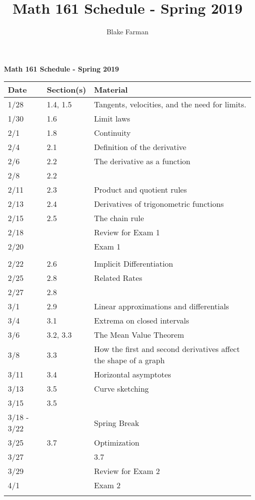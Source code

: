 \documentclass[10pt]{amsart}
\author{Blake Farman}
\title[Schedule]{Math 161 Schedule - Spring 2019}
\begin{document}

\begin{center}
  \textbf{Math 161 Schedule - Spring 2019}
  \begin{tabular}{lll}
  Date & Section(s) & Material\\
  \hline
  1/28 & 1.4, 1.5 & Tangents, velocities, and the need for limits.\\
  1/30 & 1.6 & Limit laws\\
  2/1 & 1.8 & Continuity\\
  2/4 & 2.1 & Definition of the derivative\\
  2/6 & 2.2 & The derivative as a function\\
  2/8 & 2.2 \\
  2/11 & 2.3 & Product and quotient rules\\
  2/13 & 2.4 & Derivatives of trigonometric functions\\
  2/15 & 2.5 & The chain rule\\
  2/18 & & Review for Exam 1\\
  2/20 & & Exam 1\\
  \hline\\
  2/22 & 2.6 & Implicit Differentiation\\
  2/25 & 2.8 & Related Rates\\
  2/27 & 2.8\\
  3/1 & 2.9 & Linear approximations and differentials\\
  3/4 & 3.1 & Extrema on closed intervals\\
  3/6 & 3.2, 3.3 & The Mean Value Theorem\\
  3/8 & 3.3 & How the first and second derivatives affect the shape of a graph\\
  3/11 & 3.4  & Horizontal asymptotes\\
  3/13 & 3.5 & Curve sketching\\
  3/15 & 3.5\\
  3/18 - 3/22 & & Spring Break\\
  3/25 & 3.7 & Optimization\\
  3/27 & & 3.7 \\
  3/29 & & Review for Exam 2\\
  4/1 & & Exam 2\\
  \hline\\
  

\end{tabular}
\end{center}
\end{document}
